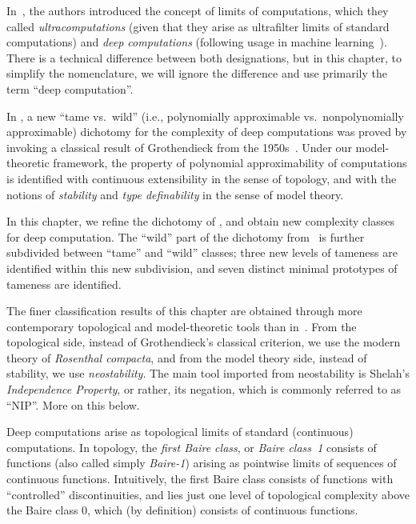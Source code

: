 In~\cite{alva2024approximability}, the authors introduced the concept of limits of computations, which they called \emph{ultracomputations} (given that they arise as ultrafilter limits of standard computations) and \emph{deep computations} (following usage in machine learning~\cite{Bai:2019}).
There is a technical difference between both designations, but in this chapter, to simplify the nomenclature, we will ignore the difference and use primarily the term ``deep computation''.

In \cite{alva2024approximability}, a new ``tame vs.\ wild'' (i.e., polynomially approximable vs.\ nonpolynomially approximable) dichotomy for the complexity of deep computations was proved by invoking a classical result of Grothendieck from the 1950s~\cite{Grothendieck:1952}.
Under our model-theoretic framework, the property of polynomial approximability of computations is identified with continuous extensibility in the sense of topology, and with the notions of \emph{stability} and \emph{type definability} in the sense of model theory.

In this chapter, we refine the dichotomy of \cite{alva2024approximability}, and obtain new complexity classes for deep computation.
The ``wild'' part of the dichotomy from~\cite{alva2024approximability} is further subdivided between ``tame'' and ``wild'' classes; three new levels of tameness are identified within this new subdivision, and seven distinct minimal prototypes of tameness are identified.

The finer classification results of this chapter are obtained through more contemporary topological and model-theoretic tools than in~\cite{alva2024approximability}. 
From the topological side, instead of Grothendieck's classical criterion, we use the modern theory of \emph{Rosenthal compacta}, and from the model theory side, instead of stability, we use \emph{neostability}.
The main tool imported from neostability is Shelah's \emph{Independence Property}, or rather, its negation, which is commonly referred to as ``NIP''.
More on this below.

Deep computations arise as topological limits of standard (continuous) computations.
In topology, the \emph{first Baire class}, or \emph{Baire class~1} consists of functions (also called simply \emph{Baire-1}) arising as pointwise limits of sequences of continuous functions.
Intuitively, the first Baire class consists of functions with ``controlled'' discontinuities, and lies just one level of topological complexity above the Baire class 0, which (by definition) consists of continuous functions.


